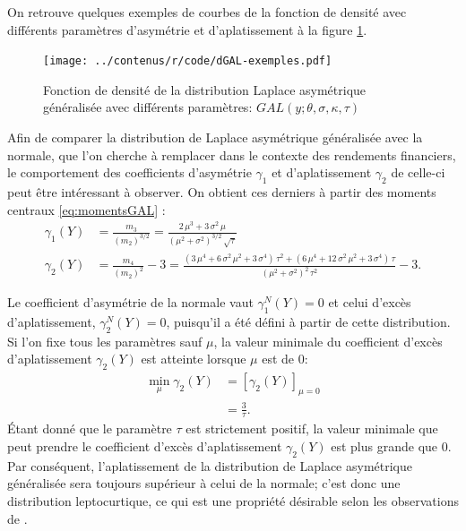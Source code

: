 On retrouve quelques exemples de courbes de la fonction de densité
avec différents paramètres d'asymétrie et d'aplatissement à la figure
\ref{fig:densiteGAL}.
\begin{figure}[!ht]
  \centering
  \texttt{[image: ../contenus/r/code/dGAL-exemples.pdf]}
  \caption{Fonction de densité de la distribution Laplace asymétrique
    généralisée avec différents paramètres:
    $GAL(y;\theta,\sigma,\kappa,\tau)$}
  \label{fig:densiteGAL}
\end{figure}

Afin de comparer la distribution de Laplace asymétrique généralisée
avec la normale, que l'on cherche à remplacer dans le contexte des
rendements financiers, le comportement des coefficients d'asymétrie
$\gamma_1$ et d'aplatissement $\gamma_2$ de celle-ci peut être
intéressant à observer. On obtient ces derniers à partir des moments
centraux \eqref{eq:momentsGAL} :
\begin{subequations}\label{eq:moments56GAL}
  \begin{align}
    \gamma_1(Y) &= \frac{m_3}{(m_2)^{3/2}} =
    \frac{2\,{\mu}^{3}+3\,{\sigma}^{2}\,\mu}{{\left( {\mu}^{2}+{\sigma}^{2}\right) }^{3/2}\,\sqrt{\tau}}\label{eq:moments5GAL}\\
    \gamma_2(Y) &= \frac{m_4}{(m_2)^{2}} - 3 = \frac{\left(
        3\,{\mu}^{4}+6\,{\sigma}^{2}\,{\mu}^{2}+3\,{\sigma}^{4}\right)
      \,{\tau}^{2}+\left(
        6\,{\mu}^{4}+12\,{\sigma}^{2}\,{\mu}^{2}+3\,{\sigma}^{4}\right)
      \,\tau}{{\left( {\mu}^{2}+{\sigma}^{2}\right) }^{2}\,{\tau}^{2}}
    - 3.\label{eq:moments6GAL}
  \end{align}
\end{subequations}

Le coefficient d'asymétrie de la normale vaut $\gamma_1^N(Y)=0$ et
celui d'excès d'aplatissement, $\gamma_2^N(Y)=0$, puisqu'il a été
défini à partir de cette distribution. Si l'on fixe tous les
paramètres sauf $\mu$, la valeur minimale du coefficient d'excès
d'aplatissement $\gamma_2(Y)$ est atteinte lorsque $\mu$ est de 0:
\begin{align*}
  \min_{\mu} \gamma_2(Y) &= \left[\gamma_2(Y)\right]_{\mu=0} \\
  &= \frac{3}{\tau}.
\end{align*}
Étant donné que le paramètre $\tau$ est strictement positif, la valeur
minimale que peut prendre le coefficient d'excès d'aplatissement
$\gamma_2(Y)$ est plus grande que 0. Par conséquent, l'aplatissement de la
distribution de Laplace asymétrique généralisée sera toujours
supérieur à celui de la normale; c'est donc une distribution
leptocurtique, ce qui est une propriété désirable selon les
observations de \cite{madan1990variance}.

